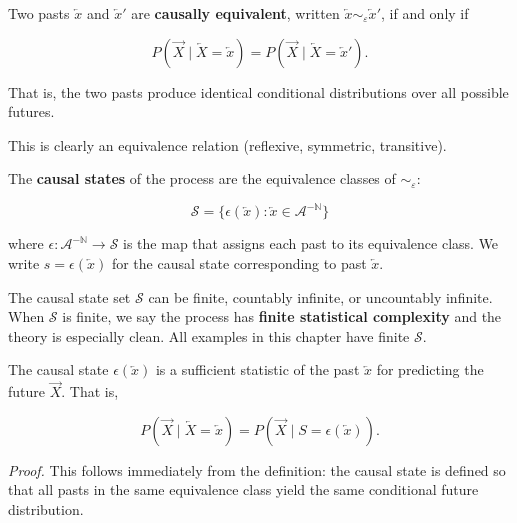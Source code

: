 \begin{definition}
Two pasts $\overleftarrow{x}$ and $\overleftarrow{x}'$ are \textbf{causally equivalent}, written $\overleftarrow{x} \sim_\varepsilon \overleftarrow{x}'$, if and only if

\[P(\overrightarrow{X} \mid \overleftarrow{X} = \overleftarrow{x}) = P(\overrightarrow{X} \mid \overleftarrow{X} = \overleftarrow{x}').\]

That is, the two pasts produce identical conditional distributions over all possible futures.

This is clearly an equivalence relation (reflexive, symmetric, transitive).
\end{definition}

\begin{definition}
The \textbf{causal states} of the process are the equivalence classes of $\sim_\varepsilon$:

\[\mathcal{S} = \{ \epsilon(\overleftarrow{x}) : \overleftarrow{x} \in \mathcal{A}^{-\mathbb{N}} \} \]

where $\epsilon: \mathcal{A}^{-\mathbb{N}} \to \mathcal{S}$ is the map that assigns each past to its equivalence class. We write $s = \epsilon(\overleftarrow{x})$ for the causal state corresponding to past $\overleftarrow{x}$.
\end{definition}

\begin{remark}
The causal state set $\mathcal{S}$ can be finite, countably infinite, or uncountably infinite. When $\mathcal{S}$ is finite, we say the process has \textbf{finite statistical complexity} and the theory is especially clean. All examples in this chapter have finite $\mathcal{S}$.
\end{remark}

\begin{proposition}
The causal state $\epsilon(\overleftarrow{x})$ is a sufficient statistic of the past $\overleftarrow{x}$ for predicting the future $\overrightarrow{X}$. That is,

\[P(\overrightarrow{X} \mid \overleftarrow{X} = \overleftarrow{x}) = P(\overrightarrow{X} \mid S = \epsilon(\overleftarrow{x})).\]

\textit{Proof.} This follows immediately from the definition: the causal state is defined so that all pasts in the same equivalence class yield the same conditional future distribution.
\end{proposition}

